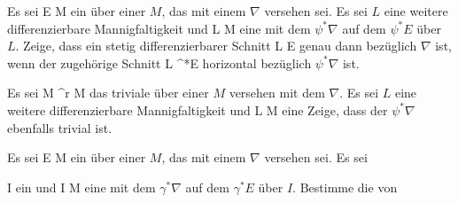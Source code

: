 \setcounter{section}{27}


{}
{

Es sei
 { E } { M
} {}
ein
über einer
$M$, das mit einem
$\nabla$ versehen sei. Es sei $L$ eine weitere differenzierbare Mannigfaltigkeit und
\maabb {\psi} { L } { M
} {}
eine
mit dem
$\psi^*\nabla$ auf dem
$\psi^*E$ über $L$. Zeige, dass ein stetig differenzierbarer Schnitt
 { L } { E
} {}
genau dann
bezüglich $\nabla$ ist, wenn der zugehörige Schnitt
 { L } { \psi^*E
} {}
horizontal bezüglich  $\psi^* \nabla$ ist.

}
{} {}

{}
{

Es sei
 {M \times \R^r } { M
} {}
das triviale
über einer
$M$ versehen mit dem
$\nabla$. Es sei $L$ eine weitere differenzierbare Mannigfaltigkeit und
\maabb {\psi} { L } { M
} {}
eine
Zeige, dass der
$\psi^*\nabla$
 {} {}
ebenfalls trivial ist.

}
{} {}

{}
{

Es sei
 { E } { M
} {}
ein
über einer
$M$, das mit einem
$\nabla$ versehen sei. Es sei

\mavergleichskette
{\vergleichskette
{ I
}
{ \subseteq }{ \R
}
{  }{
}
{    }{
}
{   }{
}
}
{}{}{}
ein
und
\maabb {\gamma} { I } { M
} {}
eine
mit dem
$\gamma^*\nabla$ auf dem
$\gamma^*E$ über $I$. Bestimme die
von

}
{} {}

